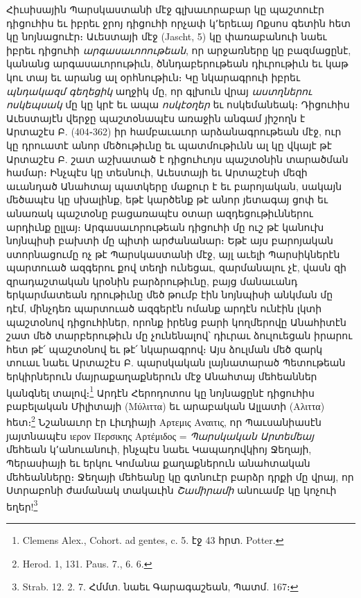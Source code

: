 \documentclass{article}
\begin{document}
{Հիւսիսային Պարսկաստանի մէջ գլխաւորաբար կը պաշտուէր դիցուհիս եւ իբրեւ ջրոյ դիցուհի որչափ կ՚երեւայ Ոքսոս գետին հետ կը նոյնացուէր։ Աւեստայի մէջ (Jascht, 5) կը փառաբանուի նաեւ իբրեւ դիցուհի \emph{արգասաւոոութեան}, որ արջառները կը բազմացընէ, կանանց արգասաւորութիւն, ծննդաբերութեան դիւրութիւն եւ կաթ կու տայ եւ արանց ալ օրհնութիւն։ Կը նկարագրուի իբրեւ \emph{պնդակազմ գեղեցիկ} աղջիկ մը, որ գլխուն վրայ \emph{աստղներու ոսկեպսակ} մը կը կրէ եւ ապա \emph{ոսկէօղեր} եւ ոսկեմանեակ։ Դիցուհիս Աւեստայէն վերջը պաշտօնապէս առաջին անգամ յիշողն է Արտաշէս Բ. (404֊362) իր համբաւաւոր արձանագրութեան մէջ, ուր կը դրուատէ անոր մեծութիւնը եւ պատմութիւնն ալ կը վկայէ թէ Արտաշէս Բ. շատ աշխատած է դիցուհւոյս պաշտօնին տարածման համար։ Ինչպէս կը տեսնուի, Աւեստայի եւ Արտաշէսի մեզի աւանդած Անահտայ պատկերը մաքուր է եւ բարոյական, սակայն մեծապէս կը սխալինք, եթէ կարծենք թէ անոր յետագայ ցոփ եւ անառակ պաշտօնը բացառապէս օտար ազդեցութիւններու արդիւնք ըլլայ։ Արգասաւորութեան դիցուհի մը ուշ թէ կանուխ նոյնպիսի բախտի մը պիտի արժանանար։ Եթէ այս բարոյական ստորնացումը ոչ թէ Պարսկաստանի մէջ, այլ աւելի Պարսիկներէն պարտուած ազգերու քով տեղի ունեցաւ, զարմանալու չէ, վասն զի զրադաշտական կրօնին բարձրութիւնը, բայց մանաւանդ երկարմատեան դրութիւնը մեծ թումբ էին նոյնպիսի անկման մը դէմ, մինչդեռ պարտուած ազգերէն ոմանք արդէն ունէին լկտի պաշտօնով դիցուհիներ, որոնք իրենց բարի կողմերովը Անահիտէն շատ մեծ տարբերութիւն մը չունենալով՝ դիւրաւ ձուլուեցան իրարու հետ թէ՛ պաշտօնով եւ թէ՛ նկարագրով։ Այս ձուլման մեծ զարկ տուաւ նաեւ Արտաշէս Բ. պարսկական լայնատարած Պետութեան երկիրներուն մայրաքաղաքներուն մէջ Անահտայ մեհեաններ կանգնել տալով։\footnote{Clemens Alex., Cohort. ad gentes, c. 5. էջ 43 հրտ. Potter.} Արդէն Հերոդոտոս կը նոյնացընէ դիցուհիս բաբելական Միլիտայի (Μύλιττα) եւ արաբական Ալլատի (Αλιττα) հետ։\footnote{Herod. 1, 131. Paus. 7., 6. 6.} Նշանաւոր էր Լիւդիայի Αρτεμις Αναιτις, որ Պաւսանիասէն յայտնապէս ιερον Περσικης Αρτέμιδος = \emph{Պարսկական Արտեմեայ} մեհեան կ՚անուանուի, ինչպէս նաեւ Կապադովկիոյ Ջեղայի, Պերասիայի եւ երկու Կոմանա քաղաքներուն անահտական մեհեանները։ Ջեղայի մեհեանը կը գտնուէր բարձր դրքի մը վրայ, որ Ստրաբոնի ժամանակ տակաւին \emph{Շամիրամի} անուամբ կը կոչուի եղեր!\footnote{Strab. 12. 2. 7. Հմմտ. նաեւ Գարագաշեան, Պատմ. 167։}

}
\end{document}
